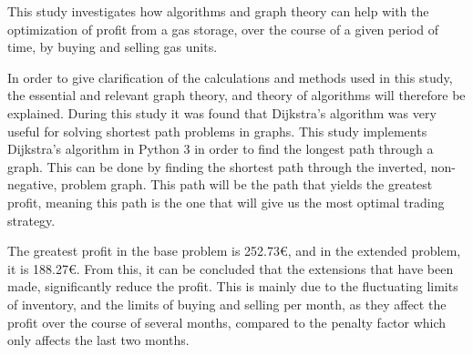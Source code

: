 
This study investigates how algorithms and graph theory can help with the optimization of profit from a gas storage, over the course of a given period of time, by buying and selling gas units. 

In order to give clarification of the calculations and methods used in this study, the essential and relevant graph theory, and theory of algorithms will therefore be explained.
During this study it was found that Dijkstra's algorithm was very useful for solving shortest path problems in graphs. This study implements Dijkstra's algorithm in Python 3 in order to find the longest path through a graph. This can be done by finding the shortest path through the inverted, non-negative, problem graph. This path will be the path that yields the greatest profit, meaning this path is the one that will give us the most optimal trading strategy.

The greatest profit in the base problem is 252.73€, and in the extended problem, it is 188.27€. From this, it can be concluded that the extensions that have been made, significantly reduce the profit. This is mainly due to the fluctuating limits of inventory, and the limits of buying and selling per month, as they affect the profit over the course of several months, compared to the penalty factor which only affects the last two months.
